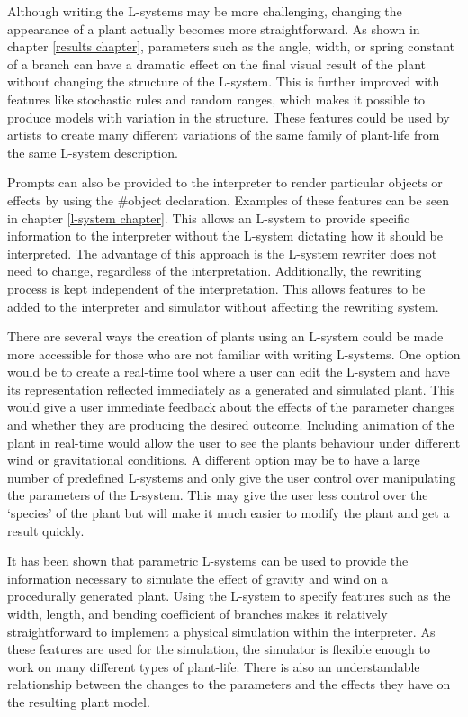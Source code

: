 Although writing the L-systems may be more challenging, changing the appearance of a plant actually becomes more straightforward. As shown in chapter \ref{results chapter}, parameters such as the angle, width, or spring constant of a branch can have a dramatic effect on the final visual result of the plant without changing the structure of the L-system. This is further improved with features like stochastic rules and random ranges, which makes it possible to produce models with variation in the structure. These features could be used by artists to create many different variations of the same family of plant-life from the same L-system description.

Prompts can also be provided to the interpreter to render particular objects or effects by using the \#object declaration. Examples of these features can be seen in chapter \ref{l-system chapter}. This allows an L-system to provide specific information to the interpreter without the L-system dictating how it should be interpreted. The advantage of this approach is the L-system rewriter does not need to change, regardless of the interpretation. Additionally, the rewriting process is kept independent of the interpretation. This allows features to be added to the interpreter and simulator without affecting the rewriting system.

There are several ways the creation of plants using an L-system could be made more accessible for those who are not familiar with writing L-systems. One option would be to create a real-time tool where a user can edit the L-system and have its representation reflected immediately as a generated and simulated plant. This would give a user immediate feedback about the effects of the parameter changes and whether they are producing the desired outcome. Including animation of the plant in real-time would allow the user to see the plants behaviour under different wind or gravitational conditions. A different option may be to have a large number of predefined L-systems and only give the user control over manipulating the parameters of the L-system. This may give the user less control over the `species' of the plant but will make it much easier to modify the plant and get a result quickly.

It has been shown that parametric L-systems can be used to provide the information necessary to simulate the effect of gravity and wind on a procedurally generated plant. Using the L-system to specify features such as the width, length, and bending coefficient of branches makes it relatively straightforward to implement a physical simulation within the interpreter. As these features are used for the simulation, the simulator is flexible enough to work on many different types of plant-life. There is also an understandable relationship between the changes to the parameters and the effects they have on the resulting plant model.
